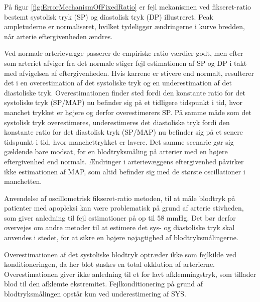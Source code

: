 \begin{minipage}[t]{0.5\textwidth}
På figur \ref{fig:ErrorMechanismOfFixedRatio} er fejl mekanismen ved fikseret-ratio bestemt systolisk tryk (SP) og diastolisk tryk (DP) illustreret. Peak ampletuderne er normaliseret, hvilket tydeliggør ændringerne i kurve bredden, når arterie eftergivenheden ændres. 

Ved normale arterievægge passerer de empiriske ratio værdier godt, men efter som arteriet afviger fra det normale stiger fejl estimationen af SP og DP i takt med afvigelsen af eftergivenheden. Hvis karrene er stivere end normalt, resulterer det i en overestimation af det systoliske tryk og en underestimation af det diastoliske tryk. Overestimationen finder sted fordi den konstante ratio for det systoliske tryk (SP/MAP) nu befinder sig på et tidligere tidspunkt i tid, hvor manchet trykket er højere og derfor overestimerers SP. På samme måde som det systolisk tryk overestimeres, underestimeres det diastoliske tryk fordi den konstante ratio for det diastolisk tryk (SP/MAP) nu befinder sig på et senere tidspunkt i tid, hvor manchettrykket er lavere. Det samme scenarie gør sig gældende bare modsat, for en blodtryksmåling på arterier med en højere eftergivenhed end normalt. Ændringer i arterievæggens eftergivenhed påvirker ikke estimationen af MAP, som altid befinder sig med de største oscillationer i manchetten.

Anvendelse af oscillometrisk fikseret-ratio metoden, til at måle blodtryk på patienter med apopleksi kan være problematisk på grund af arterie stivheden, som giver anledning til fejl estimationer på op til 58 mmHg. Det bør derfor overvejes om andre metoder til at estimere det sys- og diastoliske tryk skal anvendes i stedet, for at sikre en højere nøjagtighed af blodtryksmålingerne.

Overestimationen af det systoliske blodtryk optræder ikke som fejlkilde ved konditioneringen, da her blot ønskes en total okklution af arterierne. Overestimationen giver ikke anledning til et for lavt afklemningstryk, som tillader blod til den afklemte ekstremitet. Fejlkonditionering på grund af blodtryksmålingen opstår kun ved underestimering af SYS.
\end{minipage}
